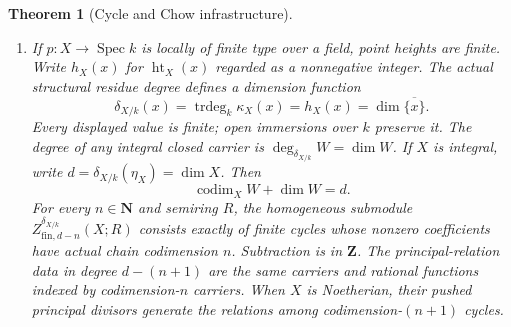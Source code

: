 \documentclass[11pt]{article}
\newtheorem{theorem}{Theorem}[section]
\theoremstyle{definition}
\theoremstyle{remark}
\begin{document}
\begin{theorem}[Cycle and Chow infrastructure]
\begin{enumerate}[label=\textup{(\roman*)},leftmargin=*]
\item
If \(p:X\to\operatorname{Spec}k\) is locally of finite type over
a field, point heights are finite. Write \(h_X(x)\) for
\(\operatorname{ht}_X(x)\) regarded as a nonnegative integer.
The actual structural residue degree defines a dimension function
\[
  \delta_{X/k}(x)
    =\operatorname{trdeg}_k\kappa_X(x)
    =h_X(x)=\dim\overline{\{x\}}.
\]
Every displayed value is finite; open immersions over \(k\)
preserve it. The degree of any integral closed carrier is
\(\deg_{\delta_{X/k}}W=\dim W\).
If \(X\) is integral, write \(d=\delta_{X/k}(\eta_X)=\dim X\).
Then
\[
 \operatorname{codim}_X W+\dim W=d.
\]
For every \(n\in\mathbf N\) and semiring \(R\), the homogeneous
submodule \(Z^{\delta_{X/k}}_{\mathrm{fin},d-n}(X;R)\) consists exactly
of finite cycles whose nonzero coefficients have actual chain
codimension \(n\). Subtraction is in \(\mathbf Z\).
The principal-relation data in degree \(d-(n+1)\) are the same
carriers and rational functions indexed by codimension-\(n\)
carriers. When \(X\) is Noetherian, their pushed principal
divisors generate the relations among codimension-\((n+1)\) cycles.
\end{enumerate}
\end{theorem}
\end{document}
